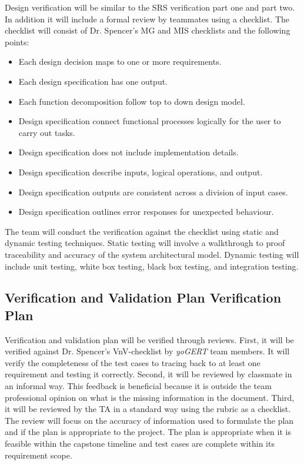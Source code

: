 \documentclass[12pt, titlepage]{article}
\begin{document}
Design verification will be similar to the SRS verification part one and
part two. In addition it will include a formal review by teammates using
a checklist. The checklist will consist of Dr. Spencer's MG and MIS checklists and the following points:
\begin{itemize}
    \item Each design decision maps to one or more requirements. 
    \item Each design specification has one output. 
    \item Each function decomposition follow top to down design model.
    \item Design specification connect functional processes logically for the user to carry out tasks.
    \item Design specification does not include implementation details.
    \item Design specification describe inputs, logical operations, and output. 
    \item Design specification outputs are consistent across a division of input cases.
    \item Design specification outlines error responses for unexpected behaviour. 
\end{itemize}

The team will conduct the verification against the checklist using 
static and dynamic testing techniques. Static testing will involve 
a walkthrough to proof traceability and accuracy of the system 
architectural model. Dynamic testing will include unit testing, white box testing, black box testing, and integration testing.




\subsection{Verification and Validation Plan Verification Plan}

Verification and validation plan will be verified through reviews. First, it will be verified against Dr. Spencer's VnV-checklist by \emph{yoGERT} team members. It will verify the completeness of the test cases to tracing back to at least one requirement and testing it correctly. Second, it will be reviewed by classmate in an informal way. This feedback is beneficial because it is outside the team professional opinion on what is the missing information in the document. Third, it will be reviewed by the TA in a standard way using the rubric as a checklist. The review will focus on the accuracy of information used to formulate the plan and if the plan is appropriate to the project. The plan is appropriate when it is feasible within the capstone timeline and test cases are complete within its requirement scope. 
\end{document}
